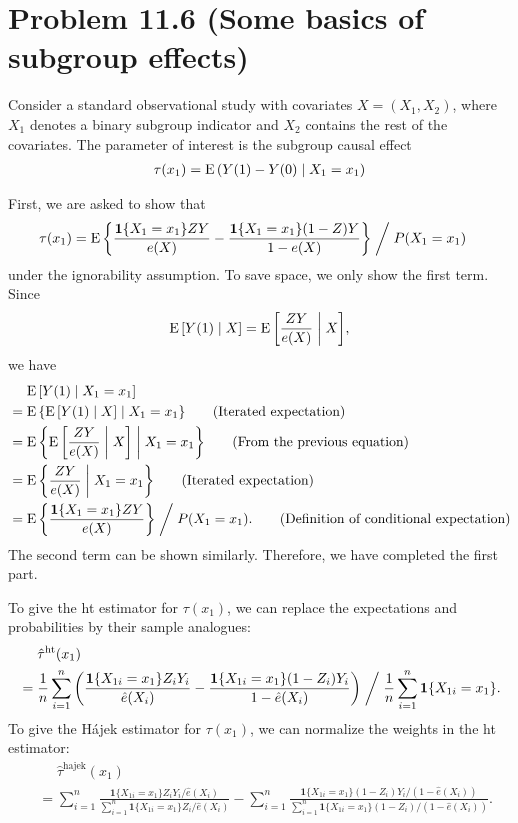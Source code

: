 \documentclass[10pt]{article}
\begin{document}
\section*{Problem 11.6 (Some basics of subgroup effects)}

Consider a standard observational study with covariates 
$X = (X_1, X_2)$, 
where $X_1$ denotes a binary subgroup indicator
and $X_2$ contains the rest of the covariates. 
The parameter of interest is the subgroup causal effect
\begin{align*}
  \tau(x_1) = \operatorname{E}{\left( Y(1) - Y(0) \mid X_1 = x_1 \right)}
\end{align*}

First, we are asked to show that
\begin{align*}
  \tau(x_1) 
  &= \operatorname{E}{\left\lbrace \frac{\mathbf{1}\{X_1 = x_1\} ZY}{e(X)} - \frac{\mathbf{1}\{X_1 = x_1\} (1 - Z)Y}{1 - e(X)} \right\rbrace} 
  \;\bigg/\; P(X_1 = x_1)
\end{align*}
under the ignorability assumption.
To save space,
we only show the first term.
Since
\begin{align*}
  \operatorname{E}{\left[ Y(1) \mid X \right]}
  = \operatorname{E}{\left[ \frac{ZY}{e(X)} \;\middle|\; X \right]},
\end{align*}
we have
\begin{align*}
  &\mathrel{\phantom{=}} \operatorname{E}{\left[ Y(1) \mid X_1 = x_1 \right]} \\
  &= \operatorname{E}{\left\lbrace \operatorname{E}{\left[ Y(1) \mid X \right]} \mid X_1 = x_1 \right\rbrace} \tag{Iterated expectation} \\
  &= \operatorname{E}{\left\lbrace \operatorname{E}{\left[ \frac{ZY}{e(X)} \;\middle|\; X \right]} \;\middle|\; X_1 = x_1 \right\rbrace} \tag{From the previous equation} \\
  &= \operatorname{E}{\left\lbrace \frac{ZY}{e(X)} \;\middle|\; X_1 = x_1 \right\rbrace} \tag{Iterated expectation} \\
  &= \operatorname{E}{\left\lbrace \frac{\mathbf{1}\{X_1 = x_1\} ZY}{e(X)} \right\rbrace} \;\bigg/\; P(X_1 = x_1). \tag{Definition of conditional expectation}
\end{align*}
The second term can be shown similarly.
Therefore, we have completed the first part.

To give the \gls{ht} estimator for $\tau(x_1)$,
we can replace the expectations and probabilities
by their sample analogues:
\begin{align*}
  &\mathrel{\phantom{=}}\hat{\tau}^{\text{ht}}(x_1) \\
  &= \frac{1}{n} \sum_{i=1}^n {\left( \frac{\mathbf{1}\{X_{1i} = x_1\} Z_i Y_i}{\hat{e}(X_i)}
  - \frac{\mathbf{1}\{X_{1i} = x_1\} (1 - Z_i) Y_i}{1 - \hat{e}(X_i)} \right)}
  \;\bigg/\; \frac{1}{n} \sum_{i = 1}^n \mathbf{1}\{X_{1i} = x_1\} .
\end{align*}
To give the H\'ajek estimator for $\tau(x_1)$,
we can normalize the weights in the \gls{ht} estimator:
\begin{align*}
  &\mathrel{\phantom{=}}\hat{\tau}^{\text{hajek}}(x_1) \\
  &= \sum_{i=1}^n \frac{\mathbf{1}\{X_{1i} = x_1\} Z_i Y_i / \hat{e}(X_i)}{\sum_{i=1}^n \mathbf{1}\{X_{1i} = x_1\} Z_i / \hat{e}(X_i)}
  - \sum_{i=1}^n \frac{\mathbf{1}\{X_{1i} = x_1\} (1 - Z_i) Y_i / (1 - \hat{e}(X_i))}{\sum_{i=1}^n \mathbf{1}\{X_{1i} = x_1\} (1 - Z_i) / (1 - \hat{e}(X_i))}.
\end{align*}

\printglossaries
\end{document}
